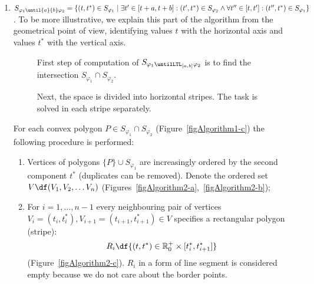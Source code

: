 \begin{enumerate}
\begin{figure}[h]
\end{figure}



	\item \label{step} $S_{\varphi_1 \until{a}{b} \varphi_2} = \lbrace (t, t^\ast) \in S_{\varphi_1} \mid \exists t' \in [t + a, t + b]: (t', t^\ast) \in S_{\varphi_2} \wedge \forall t'' \in [t, t'] : (t'', t^\ast) \in S_{\varphi_1}\rbrace$. To be more illustrative, we explain this part of the algorithm from the geometrical point of view, identifying values $t$ with the horizontal axis and values $t^\ast$ with the vertical axis.
	
	
	
\begin{figure}[h]
   \centering  
      	\caption{First step of computation of $S_{\varphi_1 \untilLTL_{[a, b]} \varphi_2}$ is to find the intersection $S_{\varphi_1} \cap S_{\varphi_2}$.}
	\label{figAlgorithm1}    
    
\end{figure}	

\begin{figure}[h]
   \centering  
      	\caption{Next, the space is divided into horizontal stripes. The task is solved in each stripe separately.}
	\label{figAlgorithm2}    
    
\end{figure}
	
	For each convex polygon $P \in S_{\varphi_1} \cap S_{\varphi_2}$ (Figure~\ref{figAlgorithm1-c}) the following procedure is performed:
		 \begin{enumerate}
			\item Vertices of polygons $\lbrace P \rbrace \cup S_{\varphi_1}$ are increasingly ordered by the second component $t^\ast$ (duplicates can be removed). Denote the ordered set $V \df (V_1, V_2, \ldots V_n)$ (Figures~\ref{figAlgorithm2-a},~\ref{figAlgorithm2-b});
			\item For $i = 1, \ldots, n-1$ every neighbouring pair of vertices $V_i = (t_{i}, t^\ast_{i}), V_{i+1} = (t_{i+1}, t^\ast_{i+1}) \in V$ specifies a rectangular polygon (stripe): $$R_{i} \df \lbrace (t, t^\ast) \in \mathbb{R}_0^+ \times [t_i^\ast, t_{i+1}^\ast] \rbrace$$ (Figure~\ref{figAlgorithm2-c}). 
			$R_{i}$ in a form of line segment is considered empty because we do not care about the border points.



\end{enumerate}
\end{enumerate}
